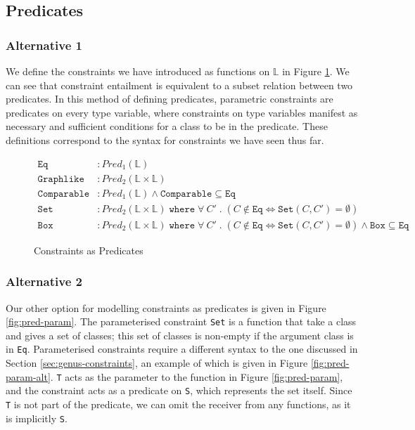 \subsection{Predicates}

\subsubsection{Alternative 1}

We define the constraints we have introduced as functions on $\mathbb{L}$ in Figure \ref{fig:pred-constraints}. We can see that constraint entailment is equivalent to a subset relation between two predicates. In this method of defining predicates, parametric constraints are predicates on every type variable, where constraints on type variables manifest as necessary and sufficient conditions for a class to be in the predicate. These definitions correspond to the syntax for constraints we have seen thus far. \\

\begin{figure}[H]
    \centering
    \begin{align*}
        \texttt{Eq} &: Pred_1(\mathbb{L}) \\
        \texttt{Graphlike} &: Pred_2(\mathbb{L} \times \mathbb{L}) \\
        \texttt{Comparable} &: Pred_1(\mathbb{L}) \land \texttt{Comparable} \subseteq \texttt{Eq} \\
        \texttt{Set} &: Pred_2(\mathbb{L} \times \mathbb{L}) \; \texttt{where} \; \forall \: C' \; . \; (C \notin \texttt{Eq} \iff \texttt{Set}(C, C') = \emptyset) \\
        \texttt{Box} &: Pred_2(\mathbb{L} \times \mathbb{L}) \; \texttt{where} \; \forall \: C' \; . \; (C \notin \texttt{Eq} \iff \texttt{Set}(C, C') = \emptyset) \land \texttt{Box} \subseteq \texttt{Eq}
    \end{align*}
    \caption{Constraints as Predicates}
    \label{fig:pred-constraints}
\end{figure}

\subsubsection{Alternative 2}

Our other option for modelling constraints as predicates is given in Figure \ref{fig:pred-param}. The parameterised constraint \texttt{Set} is a function that take a class and gives a set of classes; this set of classes is non-empty if the argument class is in \texttt{Eq}. Parameterised constraints require a different syntax to the one discussed in Section \ref{sec:genus-constraints}, an example of which is given in Figure \ref{fig:pred-param-alt}. \texttt{T} acts as the parameter to the function in Figure \ref{fig:pred-param}, and the constraint acts as a predicate on \texttt{S}, which represents the set itself. Since \texttt{T} is not part of the predicate, we can omit the receiver from any functions, as it is implicitly \texttt{S}.


